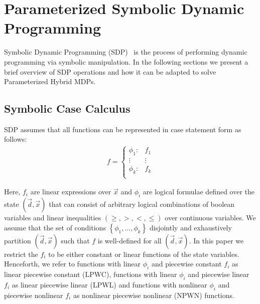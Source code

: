 \section{Parameterized Symbolic Dynamic Programming}
\label{sec:sdp}

Symbolic Dynamic Programming (SDP)~\parencite{Boutilier_IJCAI_2001} is the process of performing dynamic programming via symbolic manipulation. In the following sections we present a brief overview of SDP operations and how it can be adapted to solve Parameterized Hybrid MDPs.

\subsection{Symbolic Case Calculus}

SDP assumes that all functions can be represented in case statement form \parencite{Boutilier_IJCAI_2001} as follows:
{\footnotesize 
    \abovedisplayskip=5pt
    \belowdisplayskip=0pt
    \begin{align*}
        f = 
        \begin{cases}
            \phi_1: & f_1 \\ 
            \vdots & \vdots\\ 
            \phi_k: & f_k \\ 
        \end{cases}
    \end{align*}
}%

Here, {\footnotesize$ f_i $} are linear expressions over {\footnotesize$ \vec{x} $} and {\footnotesize$\phi_i$} are logical formulae defined over the state {\footnotesize$( \vec{d}, \vec{x})$} that can consist of arbitrary logical combinations of boolean variables and linear inequalities {\footnotesize$\left( \geq, >, <, \leq \right)$} over continuous variables. We assume that the set of conditions {\footnotesize$\left\lbrace \phi_1, \ldots, \phi_k \right\rbrace$} disjointly and exhaustively partition {\footnotesize$(\vec{d}, \vec{x})$} such that {\footnotesize$f$} is well-defined for all {\footnotesize$(\vec{d}, \vec{x})$}. In this paper we restrict the {\footnotesize$f_i$} to be either constant or linear functions of the state variables. Henceforth, we refer to functions with linear {\footnotesize$\phi_i$} and piecewise constant {\footnotesize$f_i$} as linear piecewise constant (LPWC), functions with linear {\footnotesize$\phi_i$} and piecewise linear {\footnotesize$f_i$} as linear piecewise linear (LPWL) and functions with nonlinear {\footnotesize$\phi_i$} and piecewise nonlinear {\footnotesize$f_i$} as nonlinear piecewise nonlinear (NPWN) functions.

